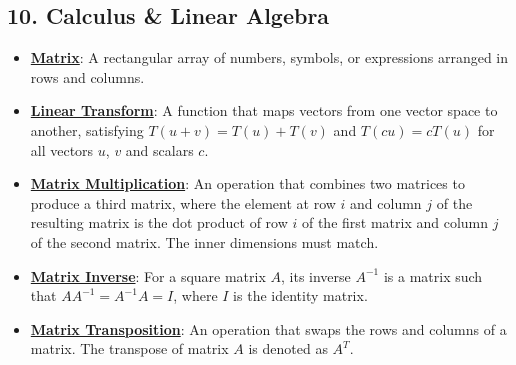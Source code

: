 \documentclass{article}%
\begin{document}
\subsection{10. Calculus \& Linear Algebra}%
\label{subsec:10.CalculusLinearAlgebra}%
\begin{itemize}[leftmargin=*]%
\item \href{https://purdue.brightspace.com/d2l/common/assets/pdfjs-d2l-dist/1.0.14-legacy/web/viewer.html?file=\%2Fcontent\%2Fenforced\%2F1095467-wl.202510.CS.24300.001\%2F04L1-Linear Algebra Primer.pdf\%3Fou\%3D1095467\&lang=en-us\&container=d2l-fileviewer-rendered-pdf\&fullscreen=d2l-fileviewer-rendered-pdf-dialog\&height=667#page=4}{\textbf{Matrix}}: A rectangular array of numbers, symbols, or expressions arranged in rows and columns.%
\item \href{https://purdue.brightspace.com/d2l/common/assets/pdfjs-d2l-dist/1.0.14-legacy/web/viewer.html?file=\%2Fcontent\%2Fenforced\%2F1095467-wl.202510.CS.24300.001\%2F04L1-Linear Algebra Primer.pdf\%3Fou\%3D1095467\&lang=en-us\&container=d2l-fileviewer-rendered-pdf\&fullscreen=d2l-fileviewer-rendered-pdf-dialog\&height=667#page=5}{\textbf{Linear Transform}}: A function that maps vectors from one vector space to another, satisfying $T(u + v) = T(u) + T(v)$ and $T(cu) = cT(u)$ for all vectors $u$, $v$ and scalars $c$.%
\item \href{https://purdue.brightspace.com/d2l/common/assets/pdfjs-d2l-dist/1.0.14-legacy/web/viewer.html?file=\%2Fcontent\%2Fenforced\%2F1095467-wl.202510.CS.24300.001\%2F04L1-Linear Algebra Primer.pdf\%3Fou\%3D1095467\&lang=en-us\&container=d2l-fileviewer-rendered-pdf\&fullscreen=d2l-fileviewer-rendered-pdf-dialog\&height=667#page=14}{\textbf{Matrix Multiplication}}: An operation that combines two matrices to produce a third matrix, where the element at row $i$ and column $j$ of the resulting matrix is the dot product of row $i$ of the first matrix and column $j$ of the second matrix. The inner dimensions must match.%
\item \href{https://purdue.brightspace.com/d2l/common/assets/pdfjs-d2l-dist/1.0.14-legacy/web/viewer.html?file=\%2Fcontent\%2Fenforced\%2F1095467-wl.202510.CS.24300.001\%2F04L1-Linear Algebra Primer.pdf\%3Fou\%3D1095467\&lang=en-us\&container=d2l-fileviewer-rendered-pdf\&fullscreen=d2l-fileviewer-rendered-pdf-dialog\&height=667#page=10}{\textbf{Matrix Inverse}}: For a square matrix $A$, its inverse $A^{-1}$ is a matrix such that $AA^{-1} = A^{-1}A = I$, where $I$ is the identity matrix.%
\item \href{https://purdue.brightspace.com/d2l/common/assets/pdfjs-d2l-dist/1.0.14-legacy/web/viewer.html?file=\%2Fcontent\%2Fenforced\%2F1095467-wl.202510.CS.24300.001\%2F04L1-Linear Algebra Primer.pdf\%3Fou\%3D1095467\&lang=en-us\&container=d2l-fileviewer-rendered-pdf\&fullscreen=d2l-fileviewer-rendered-pdf-dialog\&height=667#page=16}{\textbf{Matrix Transposition}}: An operation that swaps the rows and columns of a matrix. The transpose of matrix $A$ is denoted as $A^T$.%

\end{itemize}
\end{document}
